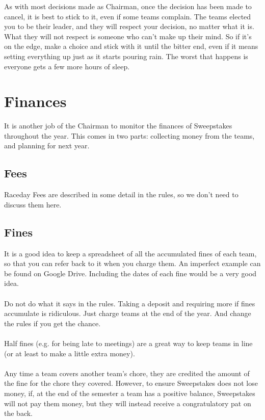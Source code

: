 As with most decisions made as Chairman, once the decision has been made to
cancel, it is best to stick to it, even if some teams complain. The teams
elected you to be their leader, and they will respect your decision, no
matter what it is. What they will not respect is someone who can't make up
their mind. So if it's on the edge, make a choice and stick with it until
the bitter end, even if it means setting everything up just as it starts
pouring rain. The worst that happens is everyone gets a few more hours of
sleep.


\section{Finances}
\label{sec:Finances}
It is another job of the Chairman to monitor the finances of Sweepstakes
throughout the year. This comes in two parts: collecting money from the teams,
and planning for next year.

\subsection{Fees}
Raceday Fees are described in some detail in the rules, so we don't need
to discuss them here.

\subsection{Fines}
It is a good idea to keep a spreadsheet of all the accumulated fines of each
team, so that you can refer back to it when you charge them. An imperfect
example can be found on Google Drive. Including the dates of each fine would
be a very good idea.
\\\\
Do not do what it says in the rules. Taking a deposit and requiring more if
fines accumulate is ridiculous. Just charge teams at the end of the year.
And change the rules if you get the chance.
\\\\
Half fines (e.g. for being late to meetings) are a great way to keep teams in
line (or at least to make a little extra money).
\\\\
Any time a team covers another team's chore, they are credited the amount
of the fine for the chore they covered. However, to ensure Sweepstakes does
not lose money, if, at the end of the semester a team has a positive balance,
Sweepstakes will not pay them money, but they will instead receive a
congratulatory pat on the back.

